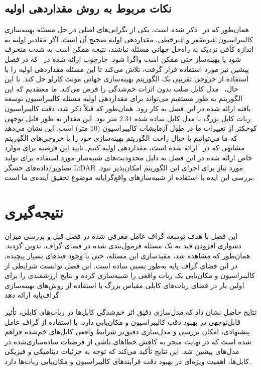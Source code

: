 \subsection{نکات مربوط به روش مقداردهی اولیه}
همان‌طور که در~\cite{khorrambakht2023graph} ذکر شده است، یکی از نگرانی‌های اصلی در حل مسئله بهینه‌سازی کالیبراسیون غیرمقعر و غیرخطی، مقداردهی اولیه صحیح آن است. اگر مقادیر اولیه به اندازه کافی نزدیک به راه‌حل جهانی مسئله نباشند، نتیجه ممکن است به شدت منحرف شود یا بهینه‌ساز حتی ممکن است واگرا شود. چارچوب ارائه شده در~\cite{khorrambakht2023graph} که در فصل پیشین نیز مورد استفاده قرار گرفت، تلاش می‌کند تا این مسئله مقداردهی اولیه را با استفاده از خروجی تقریبی یک الگوریتم بهینه‌سازی جهانی مونت کارلو حل کند. با این حال،~\cite{khorrambakht2023graph} مدل کابل صلب بدون اثرات خم‌شدگی را فرض می‌کند. ما معتقدیم که این الگوریتم به طور مستقیم می‌تواند برای مقداردهی اولیه مسئله کالیبراسیون توسعه یافته ارائه شده در این فصل به کار رود. همان‌طور که قبلاً ذکر شد، دقت کالیبراسیون ربات کابل بزرگ با مدل کابل ساده شده $2.34$ متر بود. این مقدار به طور قابل توجهی کوچکتر از تغییرات ما در طول آزمایشات کالیبراسیون ($10$ متر) است. این نشان می‌دهد که ما می‌توانیم با خیال راحت الگوریتم بهینه‌سازی خود را با خروجی‌های الگوریتم مشابهی که در~\cite{khorrambakht2023graph} ارائه شده است، مقداردهی اولیه کنیم. تأیید این فرضیه برای موارد خاص ارائه شده در این فصل به دلیل محدودیت‌های شبیه‌ساز مورد استفاده برای تولید تصاویر/داده‌های حسگر LiDAR مورد نیاز برای اجرای این الگوریتم امکان‌پذیر نبود. بررسی این ایده با استفاده از شبیه‌سازهای واقع‌گرایانه موضوع تحقیق آینده‌ی ما است.



\section{نتیجه‌گیری}
این فصل با هدف توسعه گراف عامل معرفی شده در فصل قبل و بررسی میزان دشواری افزودن قید به یک مسئله فرمول‌بندی شده در فضای گراف، تدوین گردید. همان‌طور که مشاهده شد، مقید‌سازی این مسئله، حتی با وجود قیدهای بسیار پیچیده، در این فضای گراف پایه به‌طور نسبی ساده است. این فصل توانست شرایطی از کالیبراسیون و مکان‌یابی یک ربات واقعی را شبیه‌سازی کرده و نتایج ارزشمندی را برای اولین بار در فضای ربات‌های کابلی مقیاس بزرگ با استفاده از روش‌های بهینه‌سازی گراف‌پایه ارائه دهد.

نتایج حاصل نشان داد که مدل‌سازی دقیق اثر خم‌شدگی کابل‌ها در ربات‌های کابلی، تأثیر قابل‌توجهی در بهبود دقت کالیبراسیون و مکان‌یابی دارد. با استفاده از گراف عامل پیشنهادی، امکان بررسی و مدل‌سازی دقیق‌تر شرایط واقعی کابل‌های خم‌شده فراهم شده است که در نهایت منجر به کاهش خطاهای ناشی از فرضیات ساده‌سازی‌شده در مدل‌های پیشین شد. این نتایج تأکید می‌کند که توجه به جزئیات دینامیکی و فیزیکی کابل‌ها، اهمیت ویژه‌ای در بهبود دقت فرآیندهای کالیبراسیون و مکان‌یابی ربات‌ها دارد.

